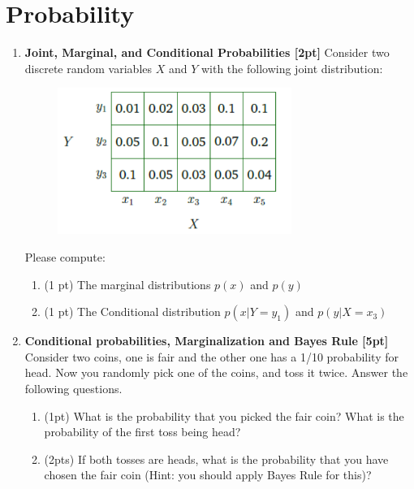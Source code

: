 \documentclass{article}
\begin{document}
\section*{Probability}
\begin{enumerate}
\item \textbf{Joint, Marginal, and Conditional Probabilities [2pt]} Consider two discrete random variables $X$ and $Y$ with the following joint distribution: 
\begin{figure}[h]
    \centering
    \includegraphics[width=3in]{joint.pdf}
\end{figure}

Please compute: 
\begin{enumerate}
    \item (1 pt) The marginal distributions $p(x)$ and $p(y)$ \\
    \item (1 pt)  The Conditional distribution $p(x|Y=y_1)$ and $p(y|X=x_3)$\\
\end{enumerate}
    
\item \textbf{Conditional probabilities, Marginalization and Bayes Rule [5pt]} Consider two coins, one is fair and the other one has a 1/10 probability for head. Now you randomly pick one of the coins, and toss it twice. Answer the following questions.
    \begin{enumerate}

    \item (1pt) What is the probability that you picked the fair coin? What is the probability of the first toss being head?\\

    \item (2pts) If both tosses are heads, what is the probability that you have chosen the fair coin (Hint: you should apply Bayes Rule for this)?\\


\end{enumerate}
\end{enumerate}
\end{document}
